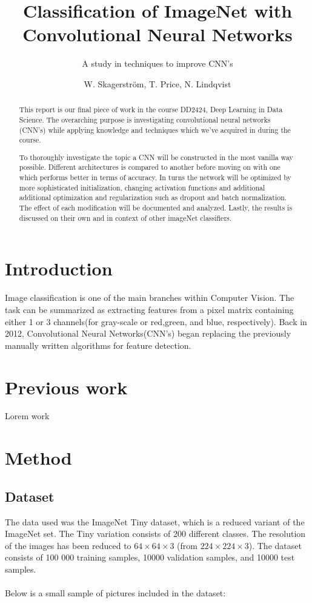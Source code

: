 \documentclass{kthreport}
\title{Classification of ImageNet with Convolutional Neural Networks}
\subtitle{A study in techniques to improve CNN's}
\author{W. Skagerström, T. Price, N. Lindqvist}
\begin{document}
\maketitle
\newpage
\begin{abstract}


This report is our final piece of work in the course DD2424, Deep Learning in Data Science. The overarching purpose is investigating convolutional neural networks (CNN's) while applying knowledge and techniques which we've acquired in during the course.

To thoroughly investigate the topic a CNN will be constructed in the most vanilla way possible. Different architectures is compared to another before moving on with one which performs better in terms of accuracy. In turns the network will be optimized by more sophisticated initialization, changing activation functions and additional additional optimization and regularization such as dropout and batch normalization. The effect of each modification will be documented and analyzed. Lastly, the results is discussed on their own and in context of other imageNet classifiers.
\end{abstract}
\newpage

\section{Introduction}
Image classification is one of the main branches within Computer Vision. The task can be summarized as extracting features from a pixel matrix containing either 1 or 3 channels(for gray-scale or red,green, and blue, respectively). Back in 2012, Convolutional Neural Networks(CNN's) began replacing the previously manually written algorithms for feature detection. 



\section{Previous work}
Lorem work

\section{Method}
\subsection{Dataset}
The data used was the ImageNet Tiny dataset, which is a reduced variant of the ImageNet set. The Tiny variation consists of 200 different classes. The resolution of the images has been reduced to $64\times64\times3$ (from  $224\times224\times3$). The dataset consists of 100 000 training samples, 10000 validation samples, and 10000 test samples.
\\\\
Below is a small sample of pictures included in the dataset:

\FloatBarrier
\end{document}
